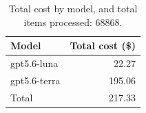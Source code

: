 \begin{table}[h]
\centering
\begin{tabular}{lr}
\toprule
Model & Total cost (\$) \\
\midrule
gpt5.6-luna & 22.27 \\
gpt5.6-terra & 195.06 \\
\midrule
Total & 217.33 \\
\bottomrule
\end{tabular}
\caption{Total cost by model, and total items processed: 68868.}
\label{tab:cost-summary}
\end{table}